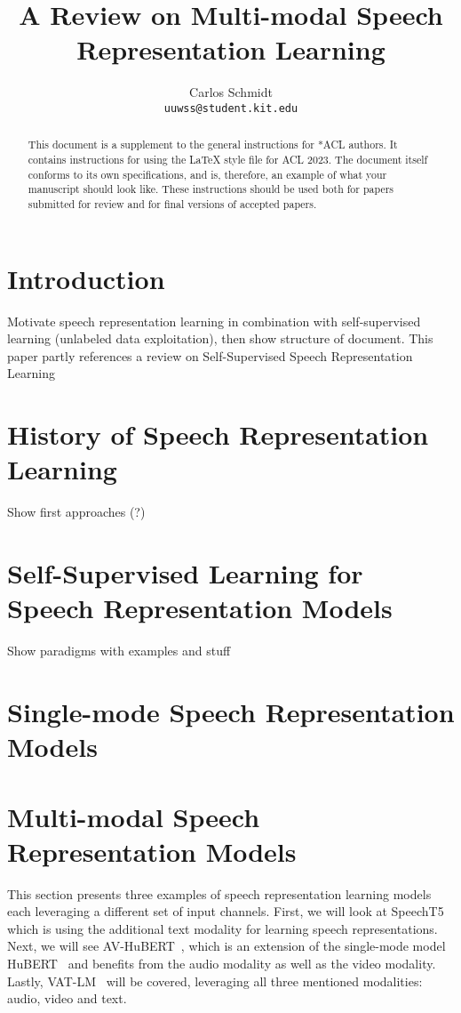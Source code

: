 \documentclass[11pt]{article}
\title{A Review on Multi-modal Speech Representation Learning}
\author{Carlos Schmidt \\\texttt{uuwss@student.kit.edu}\\}
\begin{document}
\maketitle
\begin{abstract}
This document is a supplement to the general instructions for *ACL authors. It contains instructions for using the \LaTeX{} style file for ACL 2023.
The document itself conforms to its own specifications, and is, therefore, an example of what your manuscript should look like.
These instructions should be used both for papers submitted for review and for final versions of accepted papers.
\end{abstract}

\section{Introduction}

Motivate speech representation learning in combination with self-supervised learning (unlabeled data exploitation), then show structure of document. This paper partly references a review on Self-Supervised Speech Representation Learning\cite{srl-review}

\section{History of Speech Representation Learning}

Show first approaches (?) 

\section{Self-Supervised Learning for Speech Representation Models}

Show paradigms with examples and stuff

\section{Single-mode Speech Representation Models}

\section{Multi-modal Speech Representation Models}

This section presents three examples of speech representation learning models each leveraging a different set of input channels. First, we will look at SpeechT5~\cite{speecht5} which is using the additional text modality for learning speech representations. Next, we will see AV-HuBERT~\cite{AV_HuBERT}, which is an extension of the single-mode model HuBERT~\cite{} and benefits from the audio modality as well as the video modality. Lastly, VAT-LM~\cite{} will be covered, leveraging all three mentioned modalities: audio, video and text.
\end{document}
